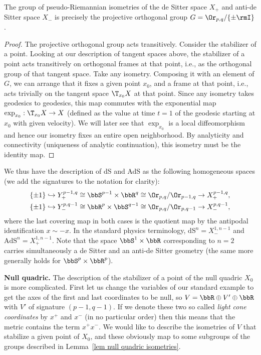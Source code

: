 \begin{thm}
    The group of pseudo-Riemannian isometries of the de Sitter space $X_+$ and anti-de Sitter space $X_-$ is precisely the projective orthogonal group $G=\Or_{p,q}\slash\{\pm \rmI\}$.
\end{thm}
\begin{proof}
    The projective orthogonal group acts transitively. Consider the stabilizer of a point. Looking at our description of tangent spaces above, the stabilizer of a point acts transitively on orthogonal frames at that point, i.e., as the orthogonal group of that tangent space. Take any isometry. Composing it with an element of $G$, we can arrange that it fixes a given point $x_0$, and a frame at that point, i.e., acts trivially on the tangent space  $\T_{x_0} X$ at that point. Since any isometry takes geodesics to geodesics, this map commutes with the exponential map $\exp_{x_0}:\T_{x_0} X\to X$ (defined as the value at time $t=1$ of the geodesic starting at $x_0$ with given velocity). We will later see that $\exp_{x_0}$ is a local diffeomorphism and hence our isometry fixes an entire open neighborhood. By analyticity and connectivity (uniqueness of analytic continuation), this isometry must be the identity map.
\end{proof}

We thus have the description of dS and AdS as the following homogeneous spaces (we add the signatures to the notation for clarity):
\begin{gather}
    \{\pm 1\}\hookrightarrow Y_+^{p-1,q}\cong \bbS^{p-1}\times\bbR^q\cong \Or_{p,q}\slash \Or_{p-1,q}\to X_+^{p-1,q},\\
    \{\pm 1\}\hookrightarrow Y_-^{p,q-1}\cong \bbR^p\times \bbS^{q-1}\cong \Or_{p,q}\slash \Or_{p,q-1}\to X_-^{p,q-1},
\end{gather}
where the last covering map in both cases is the quotient map by the antipodal identification $x\sim -x$. In the standard physics terminology, $\mathrm{dS}^n=X_-^{1,n-1}$ and $\mathrm{AdS}^n=X_+^{1,n-1}$. Note that the space $\bbS^1\times\bbR$ corresponding to $n=2$ carries simultaneously a de Sitter and an anti-de Sitter geometry (the same more generally holds for $\bbS^p\times\bbR^p$). 

\textbf{Null quadric.} The description of the stabilizer of a point of the null quadric $X_0$ is more complicated. First let us change the variables of our standard example to get the axes of the first and last coordinates to be null, so $V=\bbR\oplus V'\oplus \bbR$ with $V'$ of signature $(p-1,q-1)$. If we denote these two so called \emph{light cone coordinates} by $x^+$ and $x^-$ (in no particular order) then this means that the metric contains the term $x^+x^-$. We would like to describe the isometries of $V$ that stabilize a given point of $X_0$, and these obviously map to some subgroups of the groups described in Lemma~\ref{lem null quadric isometries}.

